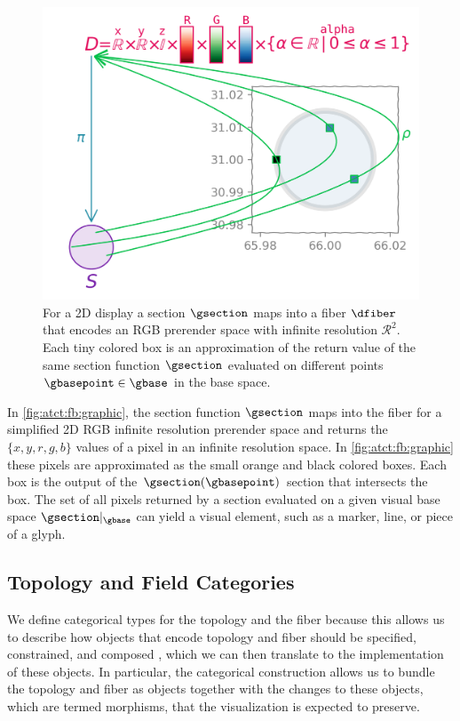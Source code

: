 \documentclass[10pt,journal,compsoc]{IEEEtran}
\theoremstyle{definition}
\theoremstyle{remark}
\begin{document}
\begin{figure}[h!]
  \includegraphics[width=1\columnwidth]{fb_rho.png}
  \caption{For a 2D display a section $\gsection$ maps into a fiber $\dfiber$ that encodes an RGB prerender space with infinite resolution $\mathcal{R}^{2}$. Each tiny colored box is an approximation of the return value of the same section function $\gsection$ evaluated on different points $\gbasepoint \in \gbase$ in the base space. \label{fig:atct:fb:graphic}}
\end{figure}

In \autoref{fig:atct:fb:graphic}, the section function $\gsection$ maps into the fiber for a simplified 2D RGB infinite resolution prerender space and returns the $\{x,y,r,g,b\}$ values of a pixel in an infinite resolution space. In \autoref{fig:atct:fb:graphic} these pixels are approximated as the small orange and black colored boxes. Each box is the output of the $\gsection(\gbasepoint)$ section that intersects the box. The set of all pixels returned by a section evaluated on a given visual base space $\gsection|_{\gbase}$ can yield a visual element, such as a marker, line, or piece of a glyph. 


\subsection{Topology and Field Categories}
\label{sec:atct:io}
We define categorical types for the topology and the fiber because this allows us to describe  how objects that encode topology and fiber should be specified, constrained, and composed \cite{wielsManagementEvolvingSpecifications1998}, which we can then translate to the implementation of these objects. In particular, the categorical construction allows us to bundle the topology and fiber as objects together with the changes to these objects, which are termed morphisms, that the visualization is expected to preserve.
\end{document}
